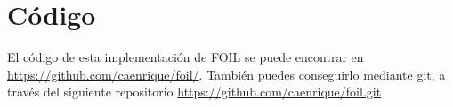 \section{Código}
El código de esta implementación de FOIL se puede encontrar en \url{https://github.com/caenrique/foil/}.
También puedes conseguirlo mediante git, a través del siguiente repositorio \url{https://github.com/caenrique/foil.git}

